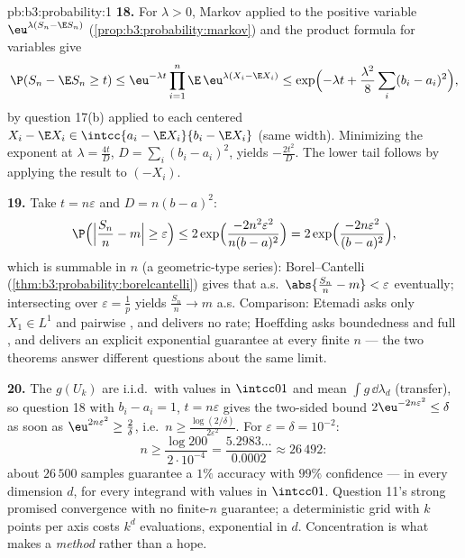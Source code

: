 \begin{solution}{pb:b3:probability:1}
\textbf{18.} For $\lambda > 0$, Markov applied to the
positive variable $\eu^{\lambda(S_n - \E S_n)}$
(\cref{prop:b3:probability:markov}) and the product
formula for  variables give
\[
\P(S_n - \E S_n \geq t) \leq \eu^{-\lambda
t}\prod_{i=1}^n\E\,\eu^{\lambda(X_i - \E X_i)}
\leq \exp\Bigl(-\lambda t +
\frac{\lambda^2}8\sum_i(b_i - a_i)^2\Bigr),
\]
by question 17(b) applied to each centered $X_i - \E X_i
\in \intcc{a_i - \E X_i}{b_i - \E X_i}$ (same width).
Minimizing the exponent at $\lambda = \frac{4t}{D}$, $D =
\sum_i(b_i - a_i)^2$, yields $-\frac{2t^2}D$. The lower
tail follows by applying the result to $(-X_i)$.

\textbf{19.} Take $t = n\varepsilon$ and $D = n(b - a)^2$:
\[
\P\Bigl(\Bigl|\frac{S_n}n - m\Bigr| \geq \varepsilon\Bigr)
\leq 2\exp\Bigl(\frac{-2n^2\varepsilon^2}{n(b-a)^2}\Bigr)
= 2\exp\Bigl(\frac{-2n\varepsilon^2}{(b-a)^2}\Bigr),
\]
which is summable in $n$ (a geometric-type series):
Borel--Cantelli (\cref{thm:b3:probability:borelcantelli})
gives that a.s.\ $\abs{\frac{S_n}n - m} < \varepsilon$
eventually; intersecting over $\varepsilon = \frac1p$
yields $\frac{S_n}n \to m$ a.s. Comparison: Etemadi asks
only $X_1 \in L^1$ and pairwise , and delivers
no rate; Hoeffding asks boundedness and full ,
and delivers an explicit exponential guarantee at every
finite $n$ --- the two theorems answer different questions
about the same limit.

\textbf{20.} The $g(U_k)$ are i.i.d.\ with values in
$\intcc01$ and mean $\int g\,\dd\lambda_d$ (transfer), so
question 18 with $b_i - a_i = 1$, $t = n\varepsilon$ gives
the two-sided bound $2\eu^{-2n\varepsilon^2} \leq \delta$
as soon as $\eu^{2n\varepsilon^2} \geq \frac2\delta$, i.e.\
$n \geq \frac{\log(2/\delta)}{2\varepsilon^2}$. For
$\varepsilon = \delta = 10^{-2}$:
\[
n \geq \frac{\log 200}{2\cdot10^{-4}} =
\frac{5.2983\ldots}{0.0002} \approx 26\,492 :
\]
about $26\,500$ samples guarantee a $1\%$ accuracy with
$99\%$ confidence --- in every dimension $d$, for every
 integrand with values in $\intcc01$. Question
11's strong \omterm{def:b3:probability:space}{law} promised convergence with no finite-$n$
guarantee; a deterministic grid with $k$ points per axis
costs $k^d$ evaluations, exponential in $d$. Concentration
is what makes  a \emph{method} rather than a
hope.


\end{solution}
